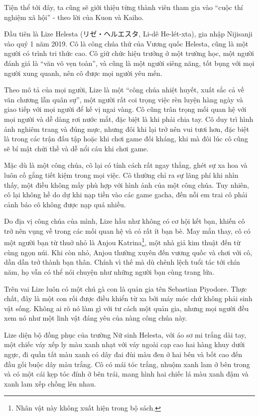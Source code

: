 \documentclass[../main.tex]{subfiles}
\begin{document}
Tiện thể tới đây, ta cũng sẽ giới thiệu từng thành viên tham gia vào ``cuộc thí nghiệm xã hội'' - theo lời của Kuon và Kaiho.

\chrint


Đầu tiên là Lize Helesta (リゼ・ヘルエスタ, Li-dê He-lét-xta), gia nhập Nijisanji vào quý 1 năm 2019. Cô là công chúa thứ của Vương quốc Helesta, cũng là một người có trình tri thức cao. Cô giữ chức hiệu trưởng ở một trường học, một người đánh giá là ``văn võ vẹn toàn'', và cũng là một người siêng năng, tốt bụng với mọi người xung quanh, nên cô được mọi người yêu mến.

Theo mô tả của mọi người, Lize là một ``công chúa nhiệt huyết, xuất sắc cả về văn chương lẫn quân sự'', một người rất coi trọng việc rèn luyện hàng ngày và giao tiếp với mọi người để kế vị ngai vàng. Cô cũng trân trọng mối quan hệ với mọi người và dễ dàng rơi nước mắt, đặc biệt là khi phải chia tay. Cô duy trì hình ảnh nghiêm trang và đúng mực, nhưng đôi khi lại trở nên vui tươi hơn, đặc biệt là trong các trận đấu tập hoặc khi chơi game đối kháng, khi mà đôi lúc cô cũng sẽ bí mật chửi thề và dễ nổi cáu khi chơi game.

Mặc dù là một công chúa, cô lại có tính cách rất ngay thẳng, ghét sự xa hoa và luôn cố gắng tiết kiệm trong mọi việc. Cô thường chỉ ra sự lãng phí khi nhìn thấy, một điều không mấy phù hợp với hình ảnh của một công chúa. Tuy nhiên, cô lại không hề do dự khi nạp tiền vào các game gacha, đến nỗi em trai cô phải cảnh báo cô không được nạp quá nhiều.

Do địa vị công chúa của mình, Lize hầu như không có cơ hội kết bạn, khiến cô trở nên vụng về trong các mối quan hệ và có rất ít bạn bè. May mắn thay, cô có một người bạn từ thuở nhỏ là Anjou Katrina\footnote{Nhân vật này không xuất hiện trong bộ sách.}, một nhà giả kim thuật đến từ cùng ngọn núi. Khi còn nhỏ, Anjou thường xuyên đến vương quốc và chơi với cô, dần dần trở thành bạn thân. Chính vì thế mà dù chênh lệch tuổi tác tới chín năm, họ vẫn có thể nói chuyện như những người bạn cùng trang lứa.

Trên vai Lize luôn có một chú gà con là quản gia tên Sebastian Piyodore. Thực chất, đây là một con rối được điều khiển từ xa bởi máy móc chứ không phải sinh vật sống. Không ai rõ nó làm gì với tư cách một quản gia, nhưng mọi người đều xem nó như một linh vật đáng yêu của nàng công chúa này.

Lize diện bộ đồng phục của trường Nữ sinh Helesta, với  áo sơ mi trắng dài tay, một chiếc váy xếp ly màu xanh nhạt với váy ngoài cạp cao hai hàng khuy dưới ngực, đi quần tất màu xanh có dây đai đùi màu đen ở hai bên và bốt cao đến đầu gối buộc dây màu trắng. Cô có mái tóc trắng, nhuộm xanh lam ở bên trong và có một cái kẹp tóc đính ở bên trái, mang hình hai chiếc lá màu xanh đậm và xanh lam xếp chồng lên nhau.
\end{document}
